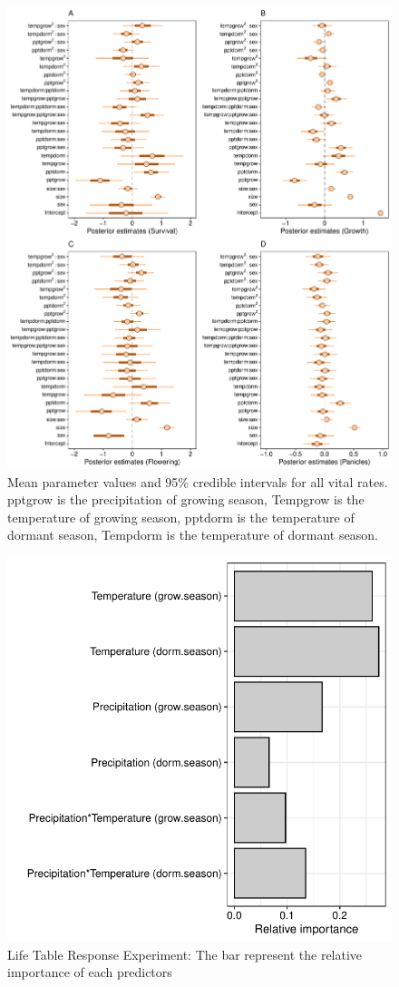 \documentclass[12pt]{article}
\begin{document}
\begin{figure}[H]
		\centering
		\includegraphics[width=0.95\linewidth]{Figures/Posterior_mean.pdf}
		\caption{Mean parameter values and 95\% credible intervals for all vital rates. 
		pptgrow is  the precipitation of growing season,
		Tempgrow is the temperature of growing season,
		pptdorm is the temperature of dormant season,
		Tempdorm is the temperature of dormant season.}
		\label{Sup:Posterior}
\end{figure}

\begin{figure}[H]
  \begin{center}
    \includegraphics[width=0.65\linewidth]{Figures/Fig_LTRE.pdf}
  \caption{Life Table Response Experiment: The bar represent the relative importance of each predictors}
  \label{Sup:LTRE}
  \end{center}
\end{figure}
\end{document}

